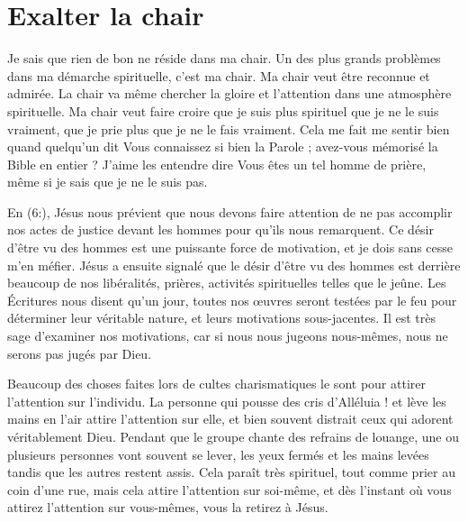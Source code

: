 \section{Exalter la chair}

Je sais que rien de bon ne réside dans ma chair.
 Un des plus grands problèmes dans ma démarche spirituelle, c'est ma chair.
 Ma chair veut être reconnue et admirée. La chair va même chercher
 la gloire et l'attention dans une atmosphère spirituelle.
 Ma chair veut faire croire que je suis plus spirituel que je ne le suis
 vraiment, que je prie plus que je ne le fais vraiment.
 Cela me fait me sentir bien quand quelqu'un dit\frcolon{}
 \Og Vous connaissez si bien la Parole ; avez-vous mémorisé la Bible
 en entier ? \Fg{} J'aime les entendre dire\frcolon{}
 \Og Vous êtes un tel homme de prière, \Fg{} même si je sais
 que je ne le suis pas.

En (6:), Jésus nous prévient que nous devons faire attention
 de ne pas accomplir nos actes de justice devant les hommes
 pour qu'ils nous remarquent. Ce désir \Og d'être vu des hommes \Fg{} est une
 puissante force de motivation, et je dois sans cesse m'en méfier.
 Jésus a ensuite signalé que le désir d'être vu des hommes
 est derrière beaucoup de nos libéralités, prières, activités spirituelles
 telles que le jeûne. Les Écritures nous disent qu'un jour,
 toutes nos œuvres seront testées par le feu pour déterminer
 leur véritable nature, et leurs motivations sous-jacentes.
 Il est très sage d'examiner nos motivations,
 car si nous nous jugeons nous-mêmes, nous ne serons pas jugés par Dieu.

Beaucoup des choses faites lors de cultes charismatiques
 le sont pour attirer l'attention sur l'individu.
 La personne qui pousse des cris \Og d'Alléluia ! \Fg{} et lève les mains en l'air
 attire l'attention sur elle, et bien souvent distrait ceux qui adorent
 véritablement Dieu. Pendant que le groupe chante des refrains de louange,
 une ou plusieurs personnes vont souvent se lever, les yeux fermés
 et les mains levées tandis que les autres restent assis.
 Cela paraît très spirituel, tout comme prier au coin d'une rue,
 mais cela attire l'attention sur soi-même, et dès l'instant
 où vous attirez l'attention sur vous-mêmes, vous la retirez à Jésus.

